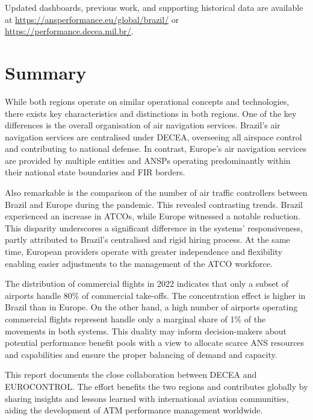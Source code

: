 \documentclass[
  a4paper,
  DIV=11,
  numbers=noendperiod]{scrreport}
\begin{document}
Updated dashboards, previous work, and supporting historical data are
available at \url{https://ansperformance.eu/global/brazil/} or
\url{https://performance.decea.mil.br/}.

\hypertarget{summary}{%
\section{Summary}\label{summary}}

While both regions operate on similar operational concepts and
technologies, there exists key characteristics and distinctions in both
regions. One of the key differences is the overall organisation of air
navigation services. Brazil's air navigation services are centralised
under DECEA, overseeing all airspace control and contributing to
national defense. In contrast, Europe's air navigation services are
provided by multiple entities and ANSPs operating predominantly within
their national state boundaries and FIR borders.

Also remarkable is the comparison of the number of air traffic
controllers between Brazil and Europe during the pandemic. This revealed
contrasting trends. Brazil experienced an increase in ATCOs, while
Europe witnessed a notable reduction. This disparity underscores a
significant difference in the systems' responsiveness, partly attributed
to Brazil's centralised and rigid hiring process. At the same time,
European providers operate with greater independence and flexibility
enabling easier adjustments to the management of the ATCO workforce.

The distribution of commercial flights in 2022 indicates that only a
subset of airports handle 80\% of commercial take-offs. The
concentration effect is higher in Brazil than in Europe. On the other
hand, a high number of airports operating commercial flights represent
handle only a marginal share of 1\% of the movements in both systems.
This duality may inform decision-makers about potential performance
benefit pools with a view to allocate scarce ANS resources and
capabilities and ensure the proper balancing of demand and capacity.

This report documents the close collaboration between DECEA and
EUROCONTROL. The effort benefits the two regions and contributes
globally by sharing insights and lessons learned with international
aviation communities, aiding the development of ATM performance
management worldwide.

\end{document}
